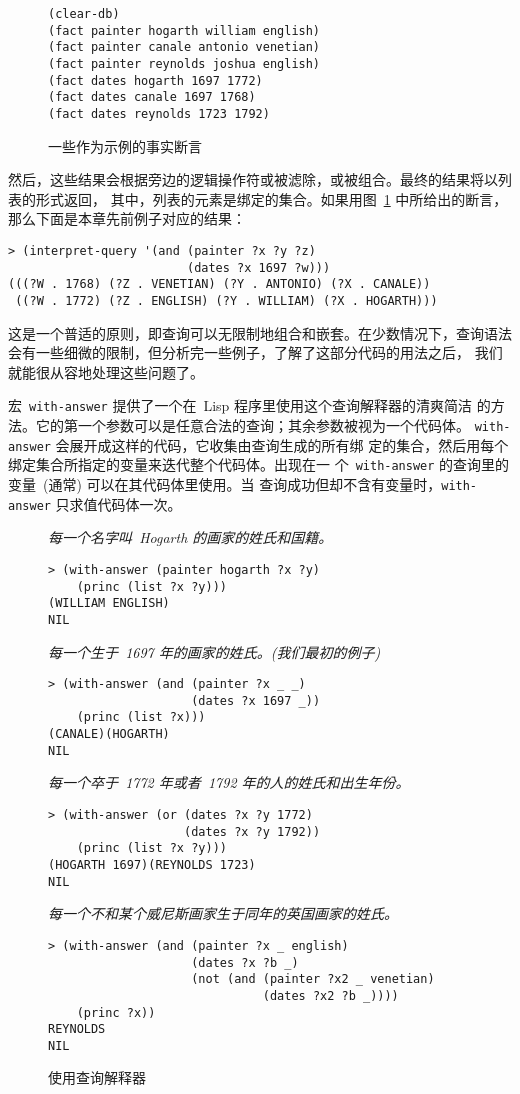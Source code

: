 \begin{figure}
\begin{lstlisting}
(clear-db)
(fact painter hogarth william english)
(fact painter canale antonio venetian)
(fact painter reynolds joshua english)
(fact dates hogarth 1697 1772)
(fact dates canale 1697 1768)
(fact dates reynolds 1723 1792)
\end{lstlisting}
  \caption{一些作为示例的事实断言}
  \label{fig:assertion_of_sample_facts}
\end{figure}

然后，这些结果会根据旁边的逻辑操作符或被滤除，或被组合。最终的结果将以列表的形式返回，
其中，列表的元素是绑定的集合。如果用图~\ref{fig:assertion_of_sample_facts} 中所给出的断言，
那么下面是本章先前例子对应的结果：
\begin{lstlisting}
> (interpret-query '(and (painter ?x ?y ?z)
                         (dates ?x 1697 ?w)))
(((?W . 1768) (?Z . VENETIAN) (?Y . ANTONIO) (?X . CANALE))
 ((?W . 1772) (?Z . ENGLISH) (?Y . WILLIAM) (?X . HOGARTH)))
\end{lstlisting}
这是一个普适的原则，即查询可以无限制地组合和嵌套。在少数情况下，查询语法
会有一些细微的限制，但分析完一些例子，了解了这部分代码的用法之后，
我们就能很从容地处理这些问题了。

宏~\texttt{with-answer} 提供了一个在~Lisp 程序里使用这个查询解释器的清爽简洁
的方法。它的第一个参数可以是任意合法的查询；其余参数被视为一个代码体。
\texttt{with-answer} 会展开成这样的代码，它收集由查询生成的所有绑
定的集合，然后用每个绑定集合所指定的变量来迭代整个代码体。出现在一
个~\texttt{with-answer} 的查询里的变量~(通常) 可以在其代码体里使用。当
查询成功但却不含有变量时，\texttt{with-answer} 只求值代码体一次。

\begin{figure}
  \emph{每一个名字叫~Hogarth 的画家的姓氏和国籍。}
\begin{lstlisting}
> (with-answer (painter hogarth ?x ?y)
    (princ (list ?x ?y)))
(WILLIAM ENGLISH)
NIL
\end{lstlisting}
  \emph{每一个生于~1697 年的画家的姓氏。(我们最初的例子)}
\begin{lstlisting}
> (with-answer (and (painter ?x _ _)
                    (dates ?x 1697 _))
    (princ (list ?x)))
(CANALE)(HOGARTH)
NIL
\end{lstlisting}
  \emph{每一个卒于~1772 年或者~1792 年的人的姓氏和出生年份。}
\begin{lstlisting}
> (with-answer (or (dates ?x ?y 1772)
                   (dates ?x ?y 1792))
    (princ (list ?x ?y)))
(HOGARTH 1697)(REYNOLDS 1723)
NIL
\end{lstlisting}
  \emph{每一个不和某个威尼斯画家生于同年的英国画家的姓氏。}
\begin{lstlisting}
> (with-answer (and (painter ?x _ english)
                    (dates ?x ?b _)
                    (not (and (painter ?x2 _ venetian)
                              (dates ?x2 ?b _))))
    (princ ?x))
REYNOLDS
NIL
\end{lstlisting}
  \caption{使用查询解释器}
  \label{fig:the_query_interpreter_in_use}
\end{figure}


